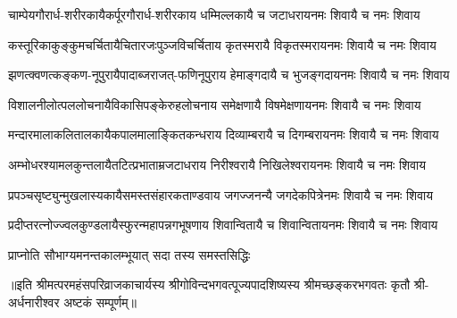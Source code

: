

\fourlineindentedshloka
{चाम्पेयगौरार्ध-शरीरकायै}{कर्पूरगौरार्ध-शरीरकाय}
{धम्मिल्लकायै च जटाधराय}{नमः शिवायै च नमः शिवाय}

\fourlineindentedshloka
{कस्तूरिकाकुङ्कुमचर्चितायै}{चितारजःपुञ्जविचर्चिताय}
{कृतस्मरायै विकृतस्मराय}{नमः शिवायै च नमः शिवाय}

\fourlineindentedshloka
{झणत्क्वणत्कङ्कण-नूपुरायै}{पादाब्जराजत्-फणिनूपुराय}
{हेमाङ्गदायै च भुजङ्गदाय}{नमः शिवायै च नमः शिवाय}

\fourlineindentedshloka
{विशालनीलोत्पललोचनायै}{विकासिपङ्केरुहलोचनाय}
{समेक्षणायै विषमेक्षणाय}{नमः शिवायै च नमः शिवाय}

\fourlineindentedshloka
{मन्दारमालाकलितालकायै}{कपालमालाङ्कितकन्धराय}
{दिव्याम्बरायै च दिगम्बराय}{नमः शिवायै च नमः शिवाय}

\fourlineindentedshloka
{अम्भोधरश्यामलकुन्तलायै}{तटित्प्रभाताम्रजटाधराय}
{निरीश्वरायै निखिलेश्वराय}{नमः शिवायै च नमः शिवाय}

\fourlineindentedshloka
{प्रपञ्चसृष्ट्युन्मुखलास्यकायै}{समस्तसंहारकताण्डवाय}
{जगज्जनन्यै जगदेकपित्रे}{नमः शिवायै च नमः शिवाय}

\fourlineindentedshloka
{प्रदीप्तरत्नोज्ज्वलकुण्डलायै}{स्फुरन्महापन्नगभूषणाय}
{शिवान्वितायै च शिवान्विताय}{नमः शिवायै च नमः शिवाय}

{प्राप्नोति सौभाग्यमनन्तकालम्}{भूयात् सदा तस्य समस्तसिद्धिः}

{॥इति श्रीमत्परमहंसपरिव्राजकाचार्यस्य श्रीगोविन्दभगवत्पूज्यपादशिष्यस्य 
श्रीमच्छङ्करभगवतः कृतौ श्री-अर्धनारीश्वर अष्टकं सम्पूर्णम्॥}
%
%
%
